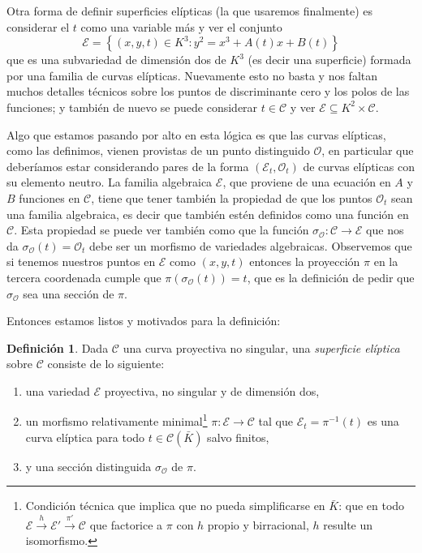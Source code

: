 \documentclass[a4paper]{book}
\theoremstyle{definition}
\newtheorem*{definition*}{Definición}
\theoremstyle{plain}
\newcommand{\OO}{\mathcal{O}}
\newcommand{\cc}{\mathcal{C}}
\newcommand{\ee}{\mathcal{E}}
\newcommand{\lla}{\left\lbrace}
\newcommand{\rla}{\right\rbrace}
\begin{document}
Otra forma de definir superficies elípticas (la que usaremos finalmente) es considerar el $t$ como una variable más y ver el conjunto
\[
\ee = \lla (x,y,t)\in K^3 : y^2=x^3+A(t)x+B(t) \rla
\]
que es una subvariedad de dimensión dos de $K^3$ (es decir una superficie) formada por una familia de curvas elípticas. Nuevamente esto no basta y nos faltan muchos detalles técnicos sobre los puntos de discriminante cero y los polos de las funciones; y también de nuevo se puede considerar $t\in \cc$ y ver $\ee \subseteq K^2\times \cc$.

Algo que estamos pasando por alto en esta lógica es que las curvas elípticas, como las definimos, vienen provistas de un punto distinguido $\OO$, en particular que deberíamos estar considerando pares de la forma $(\ee_t , \OO_t)$ de curvas elípticas con su elemento neutro. La familia algebraica $\ee$, que proviene de una ecuación en $A$ y $B$ funciones en $\cc$, tiene que tener también la propiedad de que los puntos $\OO_t$ sean una familia algebraica, es decir que también estén definidos como una función en $\cc$. Esta propiedad se puede ver también como que la función $\sigma_\OO : \cc \to \ee$ que nos da $\sigma_\OO(t) = \OO_t$ debe ser un morfismo de variedades algebraicas. Observemos que si tenemos nuestros puntos en $\ee$ como $(x,y,t)$ entonces la proyección $\pi$ en la tercera coordenada cumple que $\pi(\sigma_\OO(t))=t$, que es la definición de pedir que $\sigma_\OO$ sea una sección de $\pi$.

Entonces estamos listos y motivados para la definición:

\begin{definition*}
Dada $\cc$ una curva proyectiva no singular, una \emph{superficie elíptica} sobre $\cc$ consiste de lo siguiente:
\begin{enumerate}[label=\roman*.]
    \item una variedad $\ee$ proyectiva, no singular y de dimensión dos,
    \item un morfismo relativamente minimal\footnote{Condición técnica que implica que no pueda simplificarse en $\bar{K}$: que en todo   $\ee\xrightarrow{h}\ee'\xrightarrow{\pi'}\cc$ que factorice a $\pi$ con $h$ propio y birracional, $h$ resulte un isomorfismo.} $\pi:\ee\to\cc$ tal que $\ee_t=\pi^{-1}(t)$ es una curva elíptica para todo $t\in\cc(\bar{K})$ salvo finitos,
    \item y una sección distinguida $\sigma_\OO$ de $\pi$.
\end{enumerate}
\end{definition*}
\end{document}
